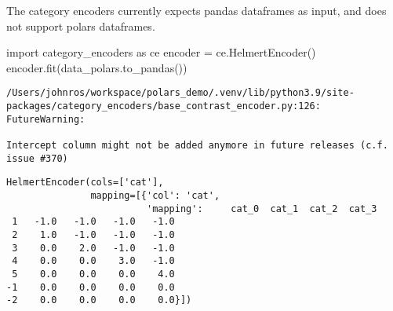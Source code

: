 \documentclass[
  letterpaper,
  DIV=11,
  numbers=noendperiod]{scrartcl}
\newenvironment{Shaded}{\begin{snugshade}}{\end{snugshade}}
\newcommand{\ImportTok}[1]{\textcolor[rgb]{0.00,0.46,0.62}{#1}}
\newcommand{\NormalTok}[1]{\textcolor[rgb]{0.00,0.23,0.31}{#1}}
\newcommand{\OperatorTok}[1]{\textcolor[rgb]{0.37,0.37,0.37}{#1}}
\begin{document}
The category encoders currently expects pandas dataframes as input, and
does not support polars dataframes.

\begin{Shaded}
\begin{Highlighting}[]
\ImportTok{import}\NormalTok{ category\_encoders }\ImportTok{as}\NormalTok{ ce}
\NormalTok{encoder }\OperatorTok{=}\NormalTok{ ce.HelmertEncoder()}
\NormalTok{encoder.fit(data\_polars.to\_pandas())}
\end{Highlighting}
\end{Shaded}

\begin{verbatim}
/Users/johnros/workspace/polars_demo/.venv/lib/python3.9/site-packages/category_encoders/base_contrast_encoder.py:126: FutureWarning:

Intercept column might not be added anymore in future releases (c.f. issue #370)
\end{verbatim}

\begin{verbatim}
HelmertEncoder(cols=['cat'],
               mapping=[{'col': 'cat',
                         'mapping':     cat_0  cat_1  cat_2  cat_3
 1   -1.0   -1.0   -1.0   -1.0
 2    1.0   -1.0   -1.0   -1.0
 3    0.0    2.0   -1.0   -1.0
 4    0.0    0.0    3.0   -1.0
 5    0.0    0.0    0.0    4.0
-1    0.0    0.0    0.0    0.0
-2    0.0    0.0    0.0    0.0}])
\end{verbatim}
\end{document}
